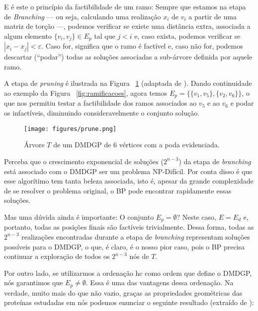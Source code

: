 E é este o princípio da factibilidade de um ramo: Sempre que estamos na etapa de \textit{Branching} --- ou seja, calculando uma realização $x_i$ de $v_i$ a partir de uma matriz de torção ---, podemos verificar se existe uma distância extra, associada a algum elemento $\{v_i,v_j\} \in E_p$ tal que $j < i$ e, caso exista, podemos verificar se $|x_i - x_j| < \varepsilon$. Caso for, significa que o ramo é factível e, caso não for, podemos descartar (``podar'') todas as soluções associadas a sub-árvore definida por aquele ramo.

A etapa de \textit{pruning} é ilustrada na Figura ~\ref{fig:poda} (adaptada de \cite{fidalgotese}). Dando continuidade ao exemplo da Figura ~\ref{fig:ramificacoes}, agora temos $E_p = \{\{v_1,v_5\},\{v_2,v_6\}\}$, o que nos permitiu testar a factibilidade dos ramos associados ao $v_5$ e ao $v_6$ e podar os infactíveis, diminuindo consideravelmente o conjunto solução.

\begin{figure}[H]
	\begin{center}
		\texttt{[image: figures/prune.png]}
	\end{center}
	\caption{Árvore $T$ de um DMDGP de 6 vértices com a poda evidenciada.}
	\label{fig:poda}
\end{figure}

Perceba que o crescimento exponencial de soluções ($2^{n-3}$) da etapa de \textit{branching} está associado com o DMDGP ser um problema NP-Difícil. Por conta disso é que esse algorítimo tem tanta beleza associada, isto é, apesar da grande complexidade de se resolver o problema original, o BP pode encontrar rapidamente essas soluções.

Mas uma dúvida ainda é importante: O conjunto $E_p = \emptyset$? Neste caso, $E = E_d$ e, portanto, todas as posições finais são factíveis trivialmente. Dessa forma, todas as $2^{n-3}$ realizações encontradas durante a etapa de \textit{branching} representam soluções possíveis para o DMDGP, o que, é claro, é o nosso pior caso, pois o BP precisa continuar a exploração de todos os $2^{n-3}$ nós de $T$. 

Por outro lado, se utilizarmos a ordenação hc como ordem que define o DMDGP, nós garantimos que $E_p \neq \emptyset$. Essa é uma das vantagens dessa ordenação. Na verdade, muito mais do que não vazio, graças as propriedades geométricas das proteínas estudadas em \cite{carlile:MinimalOrder} nós podemos enunciar o seguinte resultado (extraído de \cite{carlile:MinimalOrder}): 

